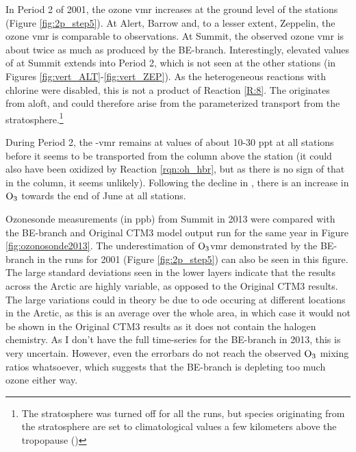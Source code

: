 \medskip

In Period 2 of 2001, the ozone \acrshort{vmr} increases at the ground level of the stations (Figure \ref{fig:2p_step5}). At Alert, Barrow and, to a lesser extent, Zeppelin, the ozone \acrshort{vmr} is comparable to observations. At Summit, the observed ozone \acrshort{vmr} is about twice as much as produced by the BE-branch. Interestingly, elevated values of  at Summit extends into Period 2, which is not seen at the other stations (in Figures \ref{fig:vert_ALT}-\ref{fig:vert_ZEP}). As the heterogeneous reactions with chlorine were disabled, this is not a product of Reaction \ref{R:8}. The  originates from aloft, and could therefore arise from the parameterized transport from the stratosphere.\footnote{The stratosphere was turned off for all the runs, but species originating from the stratosphere are set to climatological values a few kilometers above the tropopause (\cite{Sovde2012})} 

\medskip

During Period 2, the -\acrshort{vmr} remains at values of about 10-30 ppt at all stations before it seems to be transported from the column above the station (it could also have been oxidized by Reaction \ref{rqn:oh_hbr}, but as there is no sign of that in the  column, it seems unlikely). Following the decline in , there is an increase in $\mathrm{O_3}$ towards the end of June at all stations. 

\medskip

Ozonesonde measurements (in ppb) from Summit in 2013  were compared with the BE-branch and Original CTM3 model output run for the same year in Figure \ref{fig:ozonosonde2013}. The underestimation of $\mathrm{O_3}$\acrshort{vmr} demonstrated by the BE-branch in the runs for 2001 (Figure \ref{fig:2p_step5}) can also be seen in this figure. The large standard deviations seen in the lower layers indicate that the results across the Arctic are highly variable, as opposed to the Original CTM3 results. The large variations could in theory be due to \acrshort{ode} occuring at different locations in the Arctic, as this is an average over the whole area, in which case it would not be shown in the Original CTM3 results as it does not contain the halogen chemistry. As I don't have the full time-series for the BE-branch in 2013, this is very uncertain. However, even the errorbars do not reach the observed $\mathrm{O_3}$ mixing ratios whatsoever, which suggests that the BE-branch is depleting too much ozone either way.


